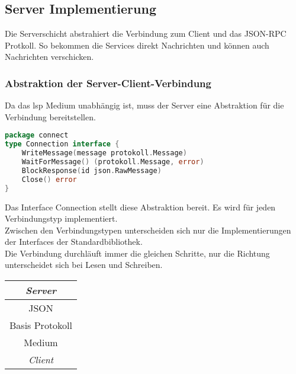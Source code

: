 \documentclass[./einleitung.tex]{subfiles}
\begin{document}
    \subsection{Server Implementierung}\label{subsec:server-implementierung}
    Die Serverschicht abstrahiert die Verbindung zum Client und das JSON-RPC Protkoll.
    So bekommen die Services direkt Nachrichten und können auch Nachrichten verschicken.
    \subsubsection{Abstraktion der Server-Client-Verbindung}
    Da das \acrshort{lsp} Medium unabhängig ist, muss der Server eine Abstraktion für die Verbindung bereitstellen.
    \begin{lstlisting}[language=Go]
package connect
type Connection interface {
	WriteMessage(message protokoll.Message)
	WaitForMessage() (protokoll.Message, error)
	BlockResponse(id json.RawMessage)
	Close() error
}
    \end{lstlisting}
    Das Interface Connection stellt diese Abstraktion bereit.
    Es wird für jeden Verbindungstyp implementiert.\\
    Zwischen den Verbindungstypen unterscheiden sich nur die Implementierungen der Interfaces der Standardbibliothek.\\
    Die Verbindung durchläuft immer die gleichen Schritte, nur die Richtung unterscheidet sich bei Lesen und Schreiben.
    \begin{center}
        \begin{center}
            \left\downarrow
            \left\uparrow
            \left\vspace{1cm}
            \begin{tabular}{|c|}
                \hline
                \textit{Server}\\
                \hline
                JSON\\
                \hline
                Basis Protokoll\\
                \hline
                Medium\\
                \hline
                \textit{Client}\\
                \hline
            \end{tabular}
        \end{center}
    \end{center}
\end{document}
